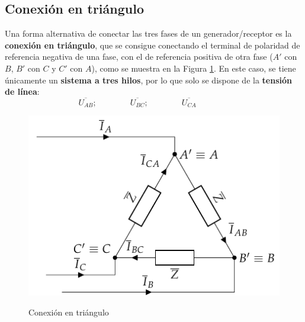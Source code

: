 	\subsection{Conexión en triángulo}\label{sec.triangulo}
	
	Una forma alternativa de conectar las tres fases de un generador/receptor es la \textbf{conexión en triángulo}, que se consigue conectando el terminal de polaridad de referencia negativa de una fase, con el de referencia positiva de otra fase ($A'$ con $B$, $B'$ con $C$ y $C'$ con $A$), como se muestra en la Figura \ref{fig.conexion_triangulo}. En este caso, se tiene únicamente un \textbf{sistema a tres hilos}, por lo que solo se dispone de la \textbf{tensión de línea}: 
	\begin{equation*}
	    \overline{U_{AB}};\qquad\qquad \overline{U_{BC}};\qquad\qquad \overline{U_{CA}}\qquad\qquad
	\end{equation*}
	\begin{figure}[H]
		\centering
		{\includegraphics{../figs/TrianguloEquilibrado_Receptor.pdf}}
		\caption{Conexión en triángulo}
		\label{fig.conexion_triangulo}
	\end{figure}
	
